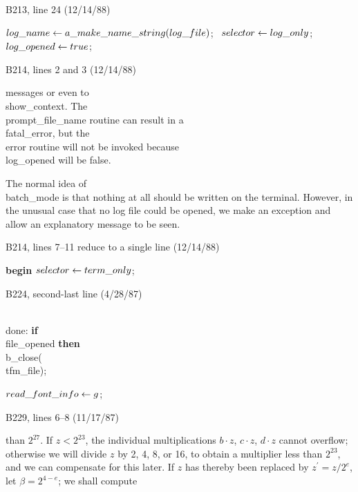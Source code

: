 \bugonpage B213, line 24 (12/14/88)

\ninepoint\noindent\kern10pt
$\\{log\_name}\gets\\{a\_make\_name\_string}(\\{log\_file})$; \
$\\{selector}\gets\\{log\_only}$; \
$\\{log\_opened}\gets\\{true}$;

\bugonpage B214, lines 2 and 3 (12/14/88)

\tenpoint\noindent
messages or even to \\{show\_context}.
The \\{prompt\_file\_name} routine can result in a \\{fatal\_error},
but the \\{error}
routine will not be invoked because \\{log\_opened} will be false.
\par\noindent\hskip10pt
The normal idea of \\{batch\_mode} is that nothing at all should be written
on the terminal. However, in the unusual case that
no log file could be opened, we make an exception and allow
an explanatory message to be seen.

\bugonpage B214, lines 7--11 reduce to a single line (12/14/88)

\ninepoint\noindent\hskip10pt
{\bf begin} $\\{selector}\gets\\{term\_only}$;

\bugonpage B224, second-last line (4/28/87)

\ninepoint\noindent
\\{done}: {\bf if} \\{file\_opened} {\bf then} \\{b\_close}(\\{tfm\_file});\par
\noindent\hskip10pt $\\{read\_font\_info}\gets g$;

\bugonpage B229, lines 6--8 (11/17/87)

\tenpoint\noindent
than $2^{27}$.
If $z<2^{23}$, the individual multiplications $b\cdot z$,
$c\cdot z$, $d\cdot z$ cannot overflow; otherwise we will divide $z$ by 2,
4, 8, or 16, to obtain a multiplier less than $2^{23}$, and we can
compensate for this later. If $z$ has thereby been replaced by
$z^\prime=z/2^e$, let $\beta=2^{4-e}$; we shall compute

